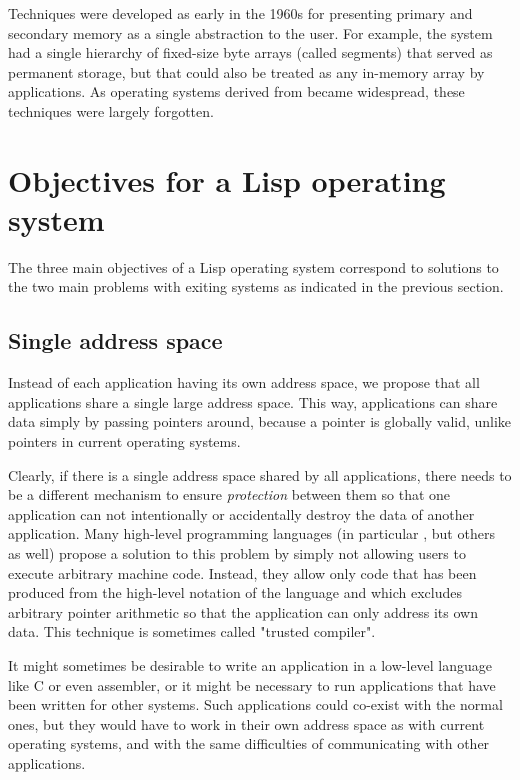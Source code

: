Techniques were developed as early in the 1960s for presenting
primary and secondary memory as a single abstraction to the user.
For example, the \multics{} system had a single hierarchy of fixed-size
byte arrays (called segments) that served as permanent storage, but
that could also be treated as any in-memory array by applications.
As operating systems derived from \unix{} became widespread, these
techniques were largely forgotten. 

\section{Objectives for a Lisp operating system}

The three main objectives of a Lisp operating system correspond to
solutions to the two main problems with exiting systems as indicated
in the previous section.

\subsection{Single address space}

Instead of each application having its own address space, we propose
that all applications share a single large address space.  This way,
applications can share data simply by passing pointers around,
because a pointer is globally valid, unlike pointers in current
operating systems. 

Clearly, if there is a single address space shared by all
applications, there needs to be a different mechanism to ensure
\emph{protection} between them so that one application can not
intentionally or accidentally destroy the data of another application.
Many high-level programming languages (in particular \lisp{}, but
others as well) propose a solution to this problem by simply not
allowing users to execute arbitrary machine code.  Instead, they allow
only code that has been produced from the high-level notation of the
language and which excludes arbitrary pointer arithmetic so that the
application can only address its own data.  This technique is
sometimes called "trusted compiler".

It might sometimes be desirable to write an application in a
low-level language like C or even assembler, or it might be
necessary to run applications that have been written for other
systems.  Such applications could co-exist with the normal ones, but
they would have to work in their own address space as with current
operating systems, and with the same difficulties of communicating
with other applications.  

